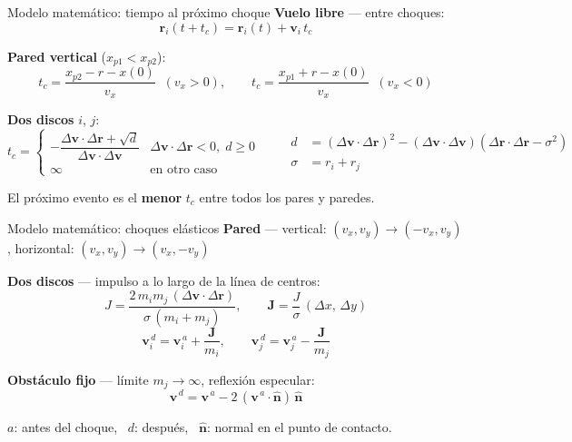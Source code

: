 \documentclass[aspectratio=169]{beamer}
\newcommand{\vect}[1]{\mathbf{#1}}
\begin{document}
\begin{frame}{Modelo matemático: tiempo al próximo choque}
  \textbf{Vuelo libre} --- entre choques:
  \[
    \vect{r}_i(t + t_c) = \vect{r}_i(t) + \vect{v}_i\, t_c
  \]

  \textbf{Pared vertical} ($x_{p1} < x_{p2}$):
  \[
    t_c = \frac{x_{p2} - r - x(0)}{v_x} \;\; (v_x > 0),
    \qquad
    t_c = \frac{x_{p1} + r - x(0)}{v_x} \;\; (v_x < 0)
  \]

  \textbf{Dos discos} $i$, $j$:
  \[
    t_c =
    \begin{cases}
      -\dfrac{\Delta\vect{v}\cdot\Delta\vect{r} + \sqrt{d}}{\Delta\vect{v}\cdot\Delta\vect{v}}
        & \Delta\vect{v}\cdot\Delta\vect{r} < 0,\; d \geq 0\\[6pt]
      \infty & \text{en otro caso}
    \end{cases}
    \qquad
    \begin{aligned}
      d &= (\Delta\vect{v}\cdot\Delta\vect{r})^2 - (\Delta\vect{v}\cdot\Delta\vect{v})(\Delta\vect{r}\cdot\Delta\vect{r} - \sigma^2)\\
      \sigma &= r_i + r_j
    \end{aligned}
  \]

  \vspace{0.2em}
  \centering
  El próximo evento es el \textbf{menor} $t_c$ entre todos los pares y paredes.
\end{frame}

\begin{frame}{Modelo matemático: choques elásticos}
  \textbf{Pared} --- vertical: $(v_x, v_y) \to (-v_x, v_y)$, \quad horizontal: $(v_x, v_y) \to (v_x, -v_y)$

  \vspace{0.6em}
  \textbf{Dos discos} --- impulso a lo largo de la línea de centros:
  \[
    J = \frac{2\, m_i m_j\, (\Delta\vect{v}\cdot\Delta\vect{r})}{\sigma\,(m_i + m_j)},
    \qquad
    \vect{J} = \frac{J}{\sigma}\,(\Delta x,\, \Delta y)
  \]
  \[
    \vect{v}_i^{\,d} = \vect{v}_i^{\,a} + \frac{\vect{J}}{m_i},
    \qquad
    \vect{v}_j^{\,d} = \vect{v}_j^{\,a} - \frac{\vect{J}}{m_j}
  \]

  \textbf{Obstáculo fijo} --- límite $m_j \to \infty$, reflexión especular:
  \[
    \vect{v}^{\,d} = \vect{v}^{\,a} - 2\,(\vect{v}^{\,a}\cdot\hat{\vect{n}})\,\hat{\vect{n}}
  \]

  \vspace{0.2em}
  \centering
  {\footnotesize $a$: antes del choque, \ $d$: después, \ $\hat{\vect{n}}$: normal en el punto de contacto.}
\end{frame}
\end{document}
